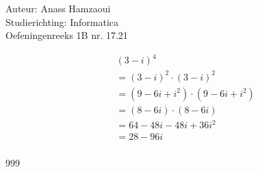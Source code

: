 \documentclass[a4paper]{article}
\begin{document}
  
\noindent \large Auteur: Anass Hamzaoui \\
\noindent \large Studierichting: Informatica \\
\noindent \large Oefeningenreeks 1B nr. 17.21 \\

\medskip

\normalsize

\begin{eqnarray*}
    && (3 - i)^4 \\
    && = (3 - i)^2 \cdot (3 - i)^2 \\
    && = (9 - 6i + i^2) \cdot (9 - 6i + i^2) \\
    && = (8 - 6i) \cdot (8 - 6i) \\
    && = 64 - 48i - 48i + 36i^2 \\
    && = 28 - 96i \\
\end{eqnarray*}

\begin{thebibliography}{999}
\end{thebibliography}
\end{document}
